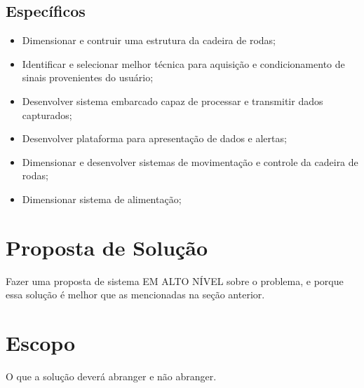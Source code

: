 \subsection{Específicos}

\begin{itemize}
\item Dimensionar e contruir uma estrutura da cadeira de rodas;
\item Identificar e selecionar melhor técnica para aquisição e condicionamento de sinais provenientes do usuário;
\item Desenvolver sistema embarcado capaz de processar e transmitir dados capturados;
\item Desenvolver plataforma para apresentação de dados e alertas;
\item Dimensionar e desenvolver sistemas de movimentação e controle da cadeira de rodas;
\item Dimensionar sistema de alimentação;
\end{itemize}

\section{Proposta de Solução}

Fazer uma proposta de sistema EM ALTO NÍVEL sobre o problema, e porque essa solução é melhor que as mencionadas na seção anterior.

\section{Escopo}

O que a solução deverá abranger e não abranger.
